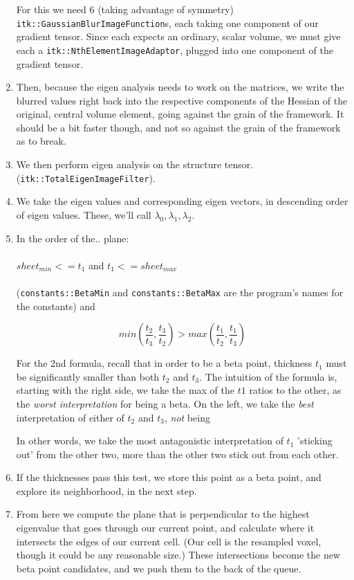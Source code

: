 \documentclass{article}
\begin{document}
\begin{enumerate}
  For this we need 6 (taking advantage of symmetry) \texttt{itk::GaussianBlurImageFunction}s,
  each taking one component of our gradient tensor. Since each expects an ordinary,
  scalar volume, we must give each a \texttt{itk::NthElementImageAdaptor}, plugged into
  one component of the gradient tensor.
  \item Then, because the eigen analysis needs to work on the matrices, we
  write the blurred values right back into the respective components of the Hessian of the
  original, central volume element, going against the grain of the framework. It should be a bit faster
  though, and not so against the grain of the framework as to break.
  \item We then perform eigen analysis on the structure tensor.
  (\texttt{itk::TotalEigenImageFilter}).
  \item We take the eigen values and corresponding eigen vectors, in descending
  order of eigen values. These, we'll call $\lambda_0, \lambda_1, \lambda_2$.
  \item In the order of the..
  plane:
\\
\\
  $sheet_{min} <= t_1$ and $t_1 <= sheet_{max}$
\\
\\
   (\texttt{constants::BetaMin} and \texttt{constants::BetaMax} are the program's
  names for the constants) and

  \[
  min \left( \frac{t_2}{t_3}, \frac{t_3}{t_2} \right) >
  max \left( \frac{t_1}{t_2}, \frac{t_1}{t_3} \right)
  \]

  For the 2nd formula, recall that in order to be a beta point, thickness $t_1$ must be
  significantly smaller than both $t_2$ and $t_3$. The intuition of the formula is,
  starting with the right side, we take the max of the $t1$ ratios to the other, as
  the \emph{worst interpretation} for being a beta. On the left, we take the \emph{best}
  interpretation of either of $t_2$ and $t_3$, \emph{not} being

  In other words, we take the most antagonistic interpretation of $t_1$ 'sticking out' from
the other two, more than the other two stick out from each other.

  \item If the thicknesses pass this test, we store this point as a beta point,
    and explore its neighborhood, in the next step.

  \item From here we compute the plane that is perpendicular to the
  highest eigenvalue that goes through our current point, and calculate where it
intersects the edges of our current cell. (Our cell
  is the resampled voxel, though it could be any reasonable size.) These intersections
become the new beta point candidates, and we push them to the back of the queue.


\end{enumerate}
\end{document}
